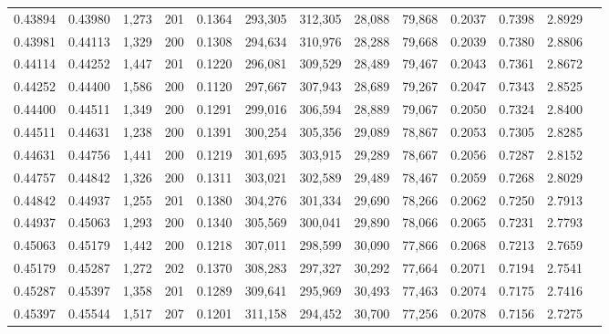 \begin{tabular}{rrrrrrrrrrrrr}
0.43894 & 0.43980 & 1,273 & 201 &                                     0.1364 & 293,305 & 312,305 &  28,088 &  79,868 & 0.2037 & 0.7398 & 2.8929 \\
0.43981 & 0.44113 & 1,329 & 200 &                                     0.1308 & 294,634 & 310,976 &  28,288 &  79,668 & 0.2039 & 0.7380 & 2.8806 \\
0.44114 & 0.44252 & 1,447 & 201 &                                     0.1220 & 296,081 & 309,529 &  28,489 &  79,467 & 0.2043 & 0.7361 & 2.8672 \\
0.44252 & 0.44400 & 1,586 & 200 &                                     0.1120 & 297,667 & 307,943 &  28,689 &  79,267 & 0.2047 & 0.7343 & 2.8525 \\
0.44400 & 0.44511 & 1,349 & 200 &                                     0.1291 & 299,016 & 306,594 &  28,889 &  79,067 & 0.2050 & 0.7324 & 2.8400 \\
0.44511 & 0.44631 & 1,238 & 200 &                                     0.1391 & 300,254 & 305,356 &  29,089 &  78,867 & 0.2053 & 0.7305 & 2.8285 \\
0.44631 & 0.44756 & 1,441 & 200 &                                     0.1219 & 301,695 & 303,915 &  29,289 &  78,667 & 0.2056 & 0.7287 & 2.8152 \\
0.44757 & 0.44842 & 1,326 & 200 &                                     0.1311 & 303,021 & 302,589 &  29,489 &  78,467 & 0.2059 & 0.7268 & 2.8029 \\
0.44842 & 0.44937 & 1,255 & 201 &                                     0.1380 & 304,276 & 301,334 &  29,690 &  78,266 & 0.2062 & 0.7250 & 2.7913 \\
0.44937 & 0.45063 & 1,293 & 200 &                                     0.1340 & 305,569 & 300,041 &  29,890 &  78,066 & 0.2065 & 0.7231 & 2.7793 \\
0.45063 & 0.45179 & 1,442 & 200 &                                     0.1218 & 307,011 & 298,599 &  30,090 &  77,866 & 0.2068 & 0.7213 & 2.7659 \\
0.45179 & 0.45287 & 1,272 & 202 &                                     0.1370 & 308,283 & 297,327 &  30,292 &  77,664 & 0.2071 & 0.7194 & 2.7541 \\
0.45287 & 0.45397 & 1,358 & 201 &                                     0.1289 & 309,641 & 295,969 &  30,493 &  77,463 & 0.2074 & 0.7175 & 2.7416 \\
0.45397 & 0.45544 & 1,517 & 207 &                                     0.1201 & 311,158 & 294,452 &  30,700 &  77,256 & 0.2078 & 0.7156 & 2.7275 \\

\end{tabular}
